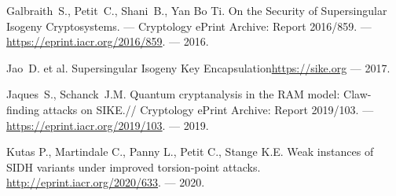 \documentclass[a4paper,12pt]{article}
\theoremstyle{definition}
\begin{document}
\begin{thebibliography}{1}

Galbraith~S., Petit~C.,  Shani~B., Yan Bo Ti.
\newblock
On the Security of Supersingular Isogeny Cryptosystems. --- 
Cryptology ePrint Archive: Report 2016/859. --- \newblock \url{https://eprint.iacr.org/2016/859}. --- 2016.

  

  Jao~D. et al. \newblock Supersingular Isogeny Key Encapsulation\newblock \url{https://sike.org} --- 2017.


Jaques~S.,  Schanck~J.M.
\newblock Quantum cryptanalysis in the RAM model: Claw-finding attacks on SIKE.//
 Cryptology ePrint Archive: Report 2019/103. ---  \newblock \url{https://eprint.iacr.org/2019/103}. --- 2019.

 
 

 

 Kutas P., Martindale C., Panny L., Petit C.,  Stange K.E. Weak instances of SIDH variants under improved torsion-point attacks. \url{http://eprint.iacr.org/2020/633}. --- 2020.


\end{thebibliography}
\end{document}
